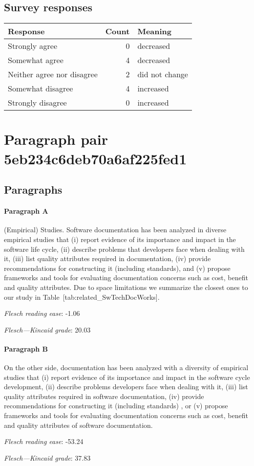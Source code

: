 \subsection{Survey responses}
\begin{tabular}{lrl}
\toprule
          \textbf{Response} &  \textbf{Count} & \textbf{Meaning} \\
\midrule
             Strongly agree &               0 &        decreased \\
             Somewhat agree &               4 &        decreased \\
 Neither agree nor disagree &               2 &   did not change \\
          Somewhat disagree &               4 &        increased \\
          Strongly disagree &               0 &        increased \\
\bottomrule
\end{tabular}

\section{Paragraph pair 5eb234c6deb70a6af225fed1}
\subsection{Paragraphs}
\paragraph{Paragraph A}
(Empirical) Studies. Software documentation has been analyzed in diverse empirical studies that (i) report evidence of its importance and impact in the software life cycle, (ii) describe problems that developers face when dealing with it, (iii) list quality attributes required in documentation, (iv) provide recommendations for constructing it (including standards), and (v) propose frameworks and tools for evaluating documentation concerns such as cost, benefit and quality attributes. Due to space limitations we summarize the closest ones to our study in Table [tab:related\_SwTechDocWorks].\par\medskip
\emph{Flesch reading ease}: -1.06\par
\emph{Flesch---Kincaid grade}: 20.03

\paragraph{Paragraph B}
On the other side, documentation has been analyzed with a diversity of empirical studies that (i) report evidence of its importance and impact in the software cycle development, (ii) describe problems developers face when dealing with it, (iii) list quality attributes required in software documentation, (iv) provide recommendations for constructing it (including standards) , or (v) propose frameworks and tools for evaluating documentation concerns such as cost, benefit and quality attributes of software documentation.\par\medskip
\emph{Flesch reading ease}: -53.24\par
\emph{Flesch---Kincaid grade}: 37.83

